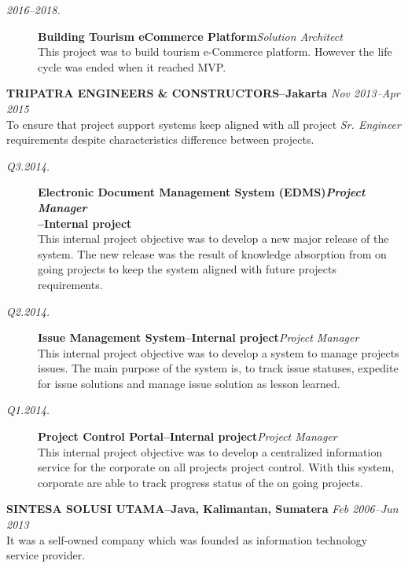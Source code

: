 \documentclass[12pt]{res} %
\begin{document}
\begin{resume}
\vspace{10pt} 
\begin{description}
    \item[{\sl 2016--2018.}] {\bf Building Tourism eCommerce Platform}\hfill {\sl Solution Architect}\\
    This project was to build tourism e-Commerce platform. However the life cycle was ended when it reached MVP.
\end{description}

{\bf \uppercase{TRIPATRA ENGINEERS \& CONSTRUCTORS}--Jakarta} \hfill {\sl Nov 2013--Apr 2015} \\[2pt]
To ensure that project support systems keep aligned with all project \hfill {\sl Sr. Engineer}\\
requirements despite characteristics difference between projects.

\vspace{10pt} 
\begin{description}
    \item[{\sl Q3.2014.}] {\bf Electronic Document Management System (EDMS)\hfill {\sl Project Manager}\\--Internal project}\\
    This internal project objective was to develop a new major release of the system. The new release
    was the result of knowledge absorption from on going projects to keep the system
    aligned with future projects requirements.
    \item[{\sl Q2.2014.}] {\bf Issue Management System--Internal project}\hfill {\sl Project Manager}\\
    This internal project objective was to develop a system to manage projects issues. The main purpose of the system is, to track issue statuses, 
    expedite for issue solutions and manage issue solution as lesson learned. 
    \item[{\sl Q1.2014.}] {\bf Project Control Portal--Internal project}\hfill {\sl Project Manager}\\
    This internal project objective was to develop a centralized information service for the corporate on all projects project control. 
    With this system, corporate are able to track progress status of the on going projects.
\end{description}
 
{\bf \uppercase{Sintesa Solusi Utama}--Java, Kalimantan, Sumatera} \hfill {\sl Feb 2006--Jun 2013} \\
It was a self-owned company which was founded as information technology service provider.


\end{resume}
\end{document}
